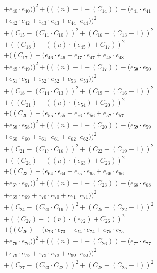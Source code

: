 \documentclass[10pt, a4paper]{article}
\begin{document}
\begin{small}
\begin{align*}
& + e_{40} \cdot e_{40}))^{2} + (((n) - 1 - (C_{14})) - (e_{41} \cdot e_{41} \\
& + e_{42} \cdot e_{42} + e_{43} \cdot e_{43} + e_{44} \cdot e_{44}))^{2} \\
& + (C_{15} - (C_{11}  \cdot  C_{10}))^{2} + (C_{16} - (C_{13} - 1))^{2} \\
& + ((C_{18}) - ((n)  \cdot  (e_{45}) + C_{17}))^{2} \\
& + ((C_{17}) - (e_{46} \cdot e_{46} + e_{47} \cdot e_{47} + e_{48} \cdot e_{48} \\
& + e_{49} \cdot e_{49}))^{2} + (((n) - 1 - (C_{17})) - (e_{50} \cdot e_{50} \\
& + e_{51} \cdot e_{51} + e_{52} \cdot e_{52} + e_{53} \cdot e_{53}))^{2} \\
& + (C_{18} - (C_{14}  \cdot  C_{13}))^{2} + (C_{19} - (C_{16} - 1))^{2} \\
& + ((C_{21}) - ((n)  \cdot  (e_{54}) + C_{20}))^{2} \\
& + ((C_{20}) - (e_{55} \cdot e_{55} + e_{56} \cdot e_{56} + e_{57} \cdot e_{57} \\
& + e_{58} \cdot e_{58}))^{2} + (((n) - 1 - (C_{20})) - (e_{59} \cdot e_{59} \\
& + e_{60} \cdot e_{60} + e_{61} \cdot e_{61} + e_{62} \cdot e_{62}))^{2} \\
& + (C_{21} - (C_{17}  \cdot  C_{16}))^{2} + (C_{22} - (C_{19} - 1))^{2} \\
& + ((C_{24}) - ((n)  \cdot  (e_{63}) + C_{23}))^{2} \\
& + ((C_{23}) - (e_{64} \cdot e_{64} + e_{65} \cdot e_{65} + e_{66} \cdot e_{66} \\
& + e_{67} \cdot e_{67}))^{2} + (((n) - 1 - (C_{23})) - (e_{68} \cdot e_{68} \\
& + e_{69} \cdot e_{69} + e_{70} \cdot e_{70} + e_{71} \cdot e_{71}))^{2} \\
& + (C_{24} - (C_{20}  \cdot  C_{19}))^{2} + (C_{25} - (C_{22} - 1))^{2} \\
& + ((C_{27}) - ((n)  \cdot  (e_{72}) + C_{26}))^{2} \\
& + ((C_{26}) - (e_{73} \cdot e_{73} + e_{74} \cdot e_{74} + e_{75} \cdot e_{75} \\
& + e_{76} \cdot e_{76}))^{2} + (((n) - 1 - (C_{26})) - (e_{77} \cdot e_{77} \\
& + e_{78} \cdot e_{78} + e_{79} \cdot e_{79} + e_{80} \cdot e_{80}))^{2} \\
& + (C_{27} - (C_{23}  \cdot  C_{22}))^{2} + (C_{28} - (C_{25} - 1))^{2} \\

\end{align*}
\end{small}
\end{document}
